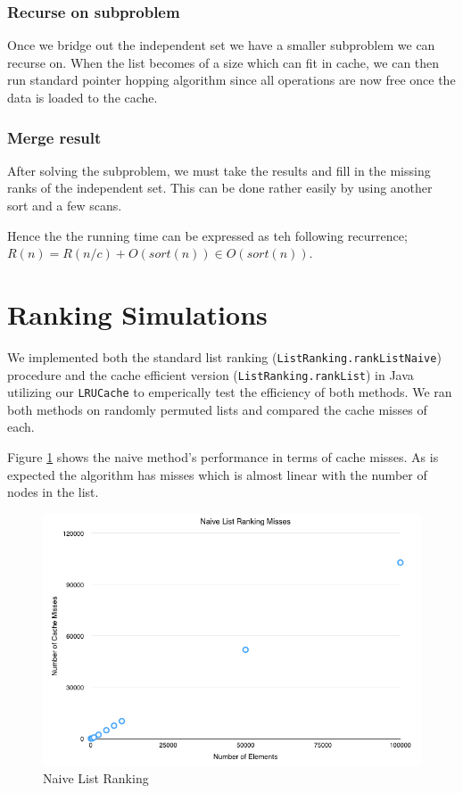 \documentclass[11pt]{article}
\begin{document}
\subsubsection{Recurse on subproblem}
Once we bridge out the independent set we have a smaller subproblem we can recurse on.  When the list becomes of a size which can fit in cache, we can then run standard pointer hopping algorithm since all operations are now free once the data is loaded to the cache.

\subsubsection{Merge result}
After solving the subproblem, we must take the results and fill in the missing ranks of the independent set.  This can be done rather easily 
by using another sort and a few scans.

Hence the the running time can be expressed as teh following recurrence; $R(n) = R(n/c) + O(sort(n)) \in O(sort(n))$.

\section{Ranking Simulations}

We implemented both the standard list ranking (\texttt{ListRanking.rankListNaive}) procedure and the cache efficient version
 (\texttt{ListRanking.rankList}) in Java utilizing our \texttt{LRUCache} to emperically test the 
efficiency of  both methods.  We ran both methods on randomly permuted lists and compared the cache misses of each.  

Figure \ref{naivelistranking} shows the naive method's performance in terms of cache misses.  As is expected the algorithm has misses which is almost linear with the number of nodes in the list.

\begin{figure}[H]  
\includegraphics[scale=0.5]{figures/NaiveListRanking.png}
\caption{Naive List Ranking}
\label{naivelistranking}
\end{figure}
\end{document}
